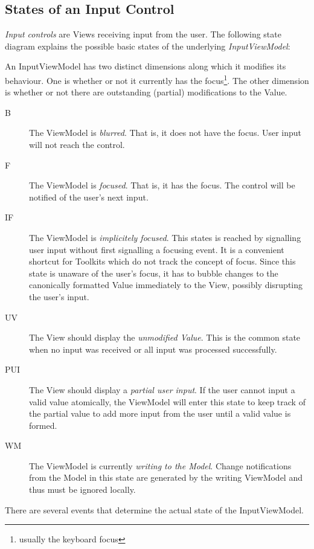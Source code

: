 \subsection{States of an Input Control}

\emph{Input controls} are Views receiving input from the user. The following state diagram 
explains the possible basic states of the underlying \emph{InputViewModel}:



An InputViewModel has two distinct dimensions along which it modifies its behaviour. One is 
whether or not it currently has the focus\footnote{usually the keyboard focus}. The other 
dimension is whether or not there are outstanding (partial) modifications to the Value.

\begin{description}
\item[B] {The ViewModel is \emph{blurred}. That is, it does not have the focus. User input will not
 reach the control.}
\item[F] {The ViewModel is \emph{focused}. That is, it has the focus. The control will be notified
 of the user's next input.}
\item[IF] {The ViewModel is \emph{implicitely focused}. This states is reached by signalling user
 input without first signalling a focusing event. It is a convenient shortcut for Toolkits which do
 not track the concept of focus. Since this state is unaware of the user's focus, it has to bubble
 changes to the canonically formatted Value immediately to the View, possibly disrupting the user's
 input.}

\item[UV] {The View should display the \emph{unmodified Value}. This is the common state when no input was received or all input was processed successfully.}
\item[PUI] {The View should display a \emph{partial user input}. If the user cannot input a valid value atomically, the ViewModel will enter this state to keep track of the partial value to add more input from the user until a valid value is formed.}
\item[WM] {The ViewModel is currently \emph{writing to the Model}. Change notifications from the Model in this state are generated by the writing ViewModel and thus must be ignored locally.}
\end{description}

There are several events that determine the actual state of the InputViewModel.


